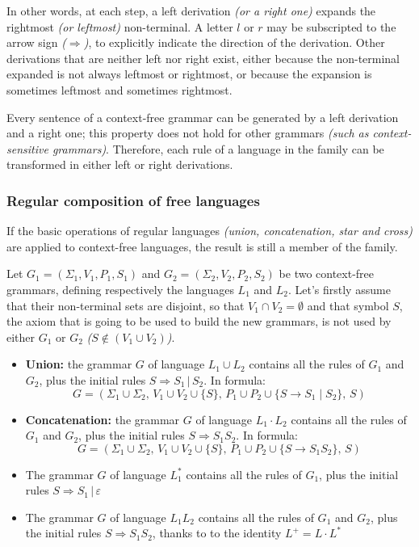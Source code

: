 \documentclass[english]{article}
\begin{document}
In other words, at each step, a left derivation \textit{(or a right one)} expands the rightmost \textit{(or leftmost)} non-terminal.
A letter \(l\) or \(r\) may be subscripted to the arrow sign \textit{(\(\Rightarrow\))}, to explicitly indicate the direction of the derivation.
Other derivations that are neither left nor right exist, either because the non-terminal expanded is not always leftmost or rightmost, or because the expansion is sometimes leftmost and sometimes rightmost.

Every sentence of a context-free grammar can be generated by a left derivation and a right one;
this property does not hold for other grammars \textit{(such as context-sensitive grammars)}.
Therefore, each rule of a language in the \CF family can be transformed in either left or right derivations.

\subsubsection{Regular composition of free languages}

If the basic operations of regular languages \textit{(union, concatenation, star and cross)} are applied to context-free languages, the result is still a member of the \CF family.

Let \(G_1 = \left(\Sigma_1, V_1, P_1, S_1 \right)\) and \(G_2 = \left(\Sigma_2, V_2, P_2, S_2 \right)\) be two context-free grammars, defining respectively the languages \(L_1\) and \(L_2\).
Let's firstly assume that their non-terminal sets are disjoint, so that \(V_1 \cap V_2 = \emptyset\) and that symbol \(S\), the axiom that is going to be used to build the new grammars, is not used by either \(G_1\) or \(G_2\) \textit{(\(S \notin (V_1 \cup V_2)\))}.

\begin{itemize}
  \item \textbf{Union:} the grammar \(G\) of language \(L_1 \cup L_2\) contains all the rules of \(G_1\) and \(G_2\), plus the initial rules \(S \Rightarrow S_1 \,|\, S_2 \). In formula:
        \[ G = \left(\Sigma_1 \cup \Sigma_2, \, V_1 \cup V_2 \cup \{S\}, \, P_1 \cup P_2 \cup \{S \rightarrow S_1 \mid S_2\}, \, S \right) \]
  \item \textbf{Concatenation:} the grammar \(G\) of language \(L_1 \cdot L_2\) contains all the rules of \(G_1\) and \(G_2\), plus the initial rules \(S \Rightarrow S_1 S_2\). In formula:
        \[ G = \left(\Sigma_1 \cup \Sigma_2, \, V_1 \cup V_2 \cup \{S\},  \,P_1 \cup P_2 \cup \{S \rightarrow S_1 S_2\}, \, S \right) \]
  \item The grammar \(G\) of language \(L_1^\ast\) contains all the rules of \(G_1\), plus the initial rules \(S \Rightarrow S_1 \,|\, \varepsilon\)
  \item The grammar \(G\) of language \(L_1  L_2\) contains all the rules of \(G_1\) and \(G_2\), plus the initial rules \(S \Rightarrow S_1 S_2\), thanks to to the identity \(L^+ = L \cdot L^\ast\)
\end{itemize}
\end{document}
